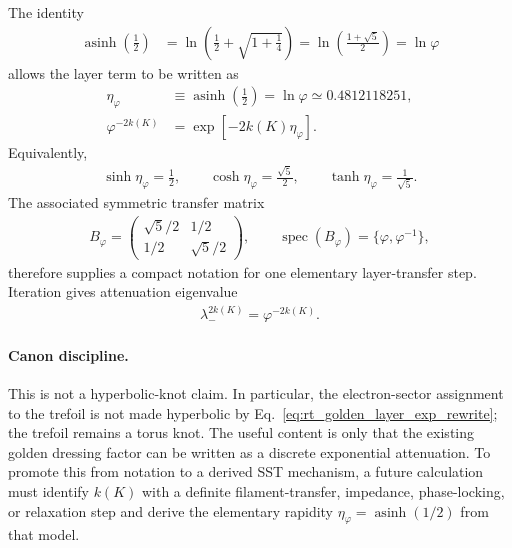 The identity
\begin{align}
    \operatorname{asinh}\!\left(\frac12\right)
    &=
    \ln\!\left(\frac12+\sqrt{1+\frac14}\right)
     =
    \ln\!\left(\frac{1+\sqrt5}{2}\right)
     =
    \ln\varphi
\end{align}
allows the layer term to be written as
\begin{align}
    \eta_\varphi
    &\equiv
    \operatorname{asinh}\!\left(\frac12\right)
    =
    \ln\varphi
    \simeq
    0.4812118251,
    \label{eq:rt_golden_layer_eta_def}\\
    \varphi^{-2k(K)}
    &=
    \exp\!\left[-2k(K)\eta_\varphi\right].
    \label{eq:rt_golden_layer_exp_rewrite}
\end{align}
Equivalently,
\begin{align}
    \sinh\eta_\varphi=\frac12,
    \qquad
    \cosh\eta_\varphi=\frac{\sqrt5}{2},
    \qquad
    \tanh\eta_\varphi=\frac{1}{\sqrt5}.
    \label{eq:rt_golden_hyperbolic_components}
\end{align}
The associated symmetric transfer matrix
\begin{align}
    B_\varphi
    =
    \begin{pmatrix}
        \sqrt5/2 & 1/2\\
        1/2 & \sqrt5/2
    \end{pmatrix},
    \qquad
    \operatorname{spec}(B_\varphi)=\{\varphi,\varphi^{-1}\},
    \label{eq:rt_golden_transfer_matrix}
\end{align}
therefore supplies a compact notation for one elementary layer-transfer
step.  Iteration gives attenuation eigenvalue
\begin{align}
    \lambda_-^{2k(K)}=\varphi^{-2k(K)}.
\end{align}

\paragraph{Canon discipline.}
This is not a hyperbolic-knot claim.  In particular, the electron-sector
assignment to the trefoil is not made hyperbolic by
Eq.~\eqref{eq:rt_golden_layer_exp_rewrite}; the trefoil remains a torus
knot.  The useful content is only that the existing golden dressing factor
can be written as a discrete exponential attenuation.  To promote this from
notation to a derived SST mechanism, a future calculation must identify
\(k(K)\) with a definite filament-transfer, impedance, phase-locking, or
relaxation step and derive the elementary rapidity
\(\eta_\varphi=\operatorname{asinh}(1/2)\) from that model.

